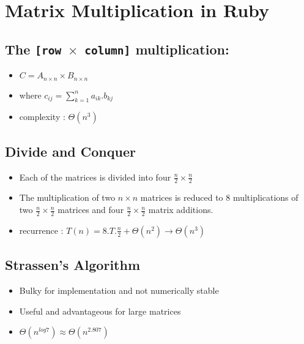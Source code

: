 \documentclass[11pt, letterpaper, oneside]{article}
\begin{document}




\section{Matrix Multiplication in Ruby}


\subsection{The \texttt{[row $\times$ column]} multiplication:}
\begin{itemize}
\item $ C = A_{n \times n} \times B_{n \times n}$
\item where $ c_{ij} = \sum\limits_{k=1}^n a_{ik} . b_{kj}   $
\item complexity : $\Theta(n^3)$ \\
\end{itemize}


\subsection{Divide and Conquer}

\begin{itemize}

\item Each of the matrices is divided into four $\frac{n}{2} \times \frac{n}{2}$
\item The multiplication of two $ n \times  n $ matrices is reduced to 8 multiplications of 
two $\frac{n}{2} \times \frac{n}{2}$ matrices and four $\frac{n}{2} \times \frac{n}{2}$ matrix additions.
\item recurrence : $T(n) = 8.T. \frac{n}{2} + \Theta(n^2) \rightarrow \Theta(n^3)$ \\
\end{itemize}

\subsection{Strassen's Algorithm}

\begin{itemize}

\item Bulky for implementation and not numerically stable
\item Useful and advantageous for large matrices
\item $ \Theta(n^{log7}) \approx \Theta(n^{2.807})$ \\
\end{itemize}
\end{document}
